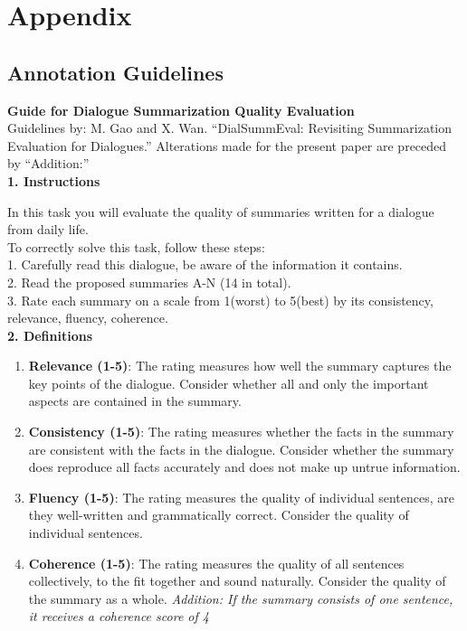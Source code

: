 
\section{Appendix}

\subsection{Annotation Guidelines}
\label{sec: annotation guidelines}

\textbf{Guide for Dialogue Summarization Quality Evaluation}\\
Guidelines by: M. Gao and X. Wan. “DialSummEval: Revisiting Summarization Evaluation for Dialogues.” Alterations made for the present paper are preceded by ``Addition:''\\

\textbf{1. Instructions}

In this task you will evaluate the quality of summaries written for a dialogue from daily life.\\
To correctly solve this task, follow these steps:\\
1. Carefully read this dialogue, be aware of the information it contains.\\
2. Read the proposed summaries A-N (14 in total).\\
3. Rate each summary on a scale from 1(worst) to 5(best) by its consistency, relevance, fluency, coherence.\\

\textbf{2. Definitions}
\begin{enumerate}
    \item \textbf{Relevance (1-5)}: The rating measures how well the summary captures the key points of the dialogue. Consider whether all and only the important aspects are contained in the summary.
    \item \textbf{Consistency (1-5)}: The rating measures whether the facts in the summary are consistent with the facts in the dialogue. Consider whether the summary does reproduce all facts accurately and does not make up untrue information.
    \item \textbf{Fluency (1-5)}: The rating measures the quality of individual sentences, are they well-written and grammatically correct. Consider the quality of individual sentences.
    \item \textbf{Coherence (1-5)}: The rating measures the quality of all sentences collectively, to the fit together and sound naturally. Consider the quality of the summary as a whole. \textit{Addition: If the summary consists of one sentence, it receives a coherence score of 4}
\end{enumerate}


